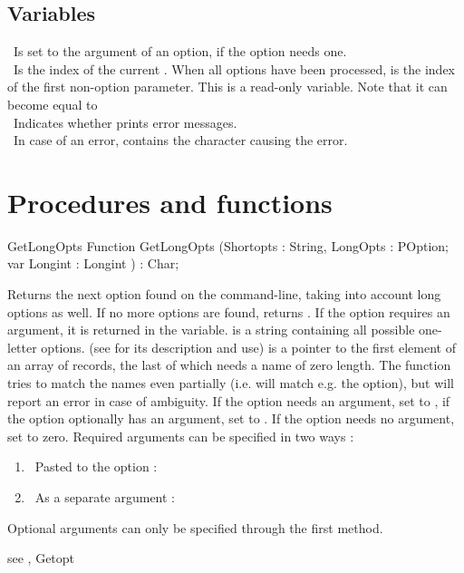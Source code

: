 \subsection{Variables}
 \ Is set to the argument of an option, if the option needs
one.\\
 \ Is the index of the current . When
all options have been processed,  is the index of the first
non-option parameter. This is a read-only variable. Note that it can become
equal to \\
 \ Indicates whether  prints error
messages.\\
 \  In case of an error, contains the character causing the 
error.
\section {Procedures and functions}
\begin{function}{GetLongOpts}
\Declaration
Function GetLongOpts (Shortopts : String, LongOpts : POption; var Longint
: Longint ) : Char;

\Description

Returns the next option found on the command-line, taking into account long
options as well. If no more options are
found, returns . If the option requires an argument, it is
returned in the  variable.
 is a string containing all possible one-letter options.
(see  for its description and use)
 is a pointer to the first element of an array of  
records, the last of which needs a name of zero length.  
The function tries to match the names even partially (i.e.  
will match e.g. the  option), but will report an error in case of
ambiguity.
If the option needs an argument, set  to
, if the option optionally has an argument, set
 to . If the option needs no argument,
set  to zero.
Required arguments can be specified in two ways : 
\begin{enumerate}
\item \ Pasted to the option : 
\item \ As a separate argument : 
\end{enumerate}
Optional arguments can only be specified through the first method.

\Errors
 see , 
\SeeAlso
Getopt
\end{function}
